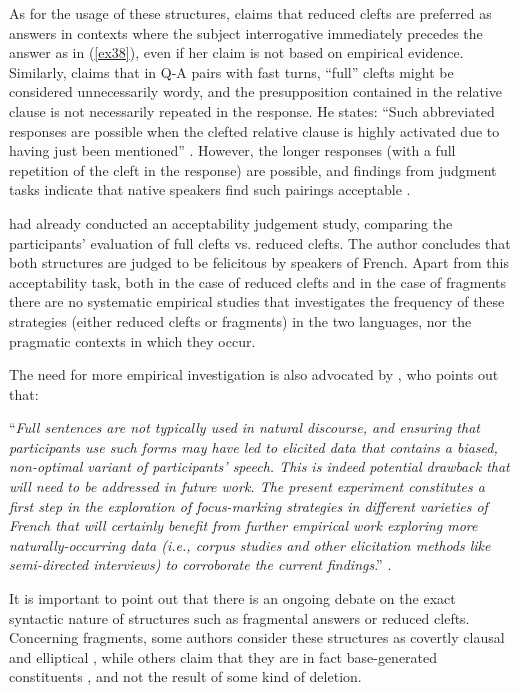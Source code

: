 As for the usage of these structures, \textcite{belletti2005answering} claims that reduced clefts are preferred as answers in contexts where the subject interrogative immediately precedes the answer as in (\ref{ex38}), even if her claim is not based on empirical evidence. Similarly, \textcite{reichle2014cleft} claims that in Q-A pairs with fast turns, ``full” clefts might be considered unnecessarily wordy, and the presupposition contained in the relative clause is not necessarily repeated in the response. He states: “Such abbreviated responses are possible when the clefted relative clause is highly activated due to having just been mentioned” \parencite[8]{reichle2014cleft}. However, the longer responses (with a full repetition of the cleft in the response) are possible, and findings from judgment tasks indicate that native speakers find such pairings acceptable \parencite{reichle2014cleft}.

\textcite{katz2000categories} had already conducted an acceptability judgement study, comparing the participants' evaluation of full clefts vs. reduced clefts. The author concludes that both structures are judged to be felicitous by speakers of French. Apart from this acceptability task, both in the case of reduced clefts and in the case of fragments  there are no systematic empirical studies that investigates the frequency of these strategies (either reduced clefts or fragments) in the two languages, nor the pragmatic contexts in which they occur.

The need for more empirical investigation is also advocated by \textcite{destruel2016focus}, who points out that: 

“\textit{Full sentences are not typically used in natural discourse, and ensuring that participants use such forms may have led to elicited data that contains a biased, non-optimal variant of participants' speech. This is indeed potential drawback that will need to be addressed in future work. The present experiment constitutes a first step in the exploration of focus-marking strategies in different varieties of French that will certainly benefit from further empirical work exploring more naturally-occurring data (i.e., corpus studies and other elicitation methods like semi-directed interviews) to corroborate the current findings}.” \parencite[309]{destruel2016focus}.

It is important to point out that there is an ongoing debate on the exact syntactic nature of structures such as fragmental answers or reduced clefts. 
Concerning fragments, some  authors  consider these structures as covertly clausal and elliptical \parencite{merchant2005fragments}, while others claim that they are in fact base-generated constituents \parencite{stainton1998quantifier, jonathan2000interrogative, jacobson2016short}, and not the result of some kind of deletion.

